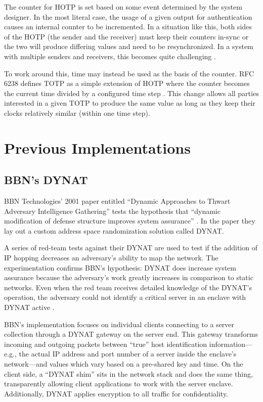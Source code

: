 \par The counter for \ac{HOTP} is set based on some event determined by the system designer. In the most literal case, the usage of a given output for authentication causes an internal counter to be incremented. In a situation like this, both sides of the HOTP (the sender and the receiver) must keep their counters in-sync or the two will produce differing values and need to be resynchronized. In a system with multiple senders and receivers, this becomes quite challenging .

\par To work around this, time may instead be used as the basis of the counter. RFC 6238 defines \ac{TOTP} as a simple extension of \ac{HOTP} where the counter becomes the current time divided by a configured time step \cite{rfc6238}. This change allows all parties interested in a given \ac{TOTP} to produce the same value as long as they keep their clocks relatively similar (within one time step). 

\section{Previous Implementations}
\label{sec:related_research}
\subsection{BBN's \acf{DYNAT}}
\par BBN Technologies' 2001 paper entitled ``Dynamic Approaches to Thwart Adversary Intelligence Gathering'' tests the hypothesis that ``dynamic modification of defense structure improves system assurance'' \cite{BBNDYNAT}. In the paper they lay out a custom address space randomization solution called \acf{DYNAT}.

\par A series of red-team tests against their \ac{DYNAT} are used to test if the addition of \ac{IP} hopping decreases an adversary's ability to map the network. The experimentation confirms BBN's hypothesis: DYNAT does increase system assurance because the adversary's work greatly increases in comparison to static networks. Even when the red team receives detailed knowledge of the DYNAT's operation, the adversary could not identify a critical server in an enclave with DYNAT active \cite{BBNDYNAT}.

\par BBN's implementation focuses on individual clients connecting to a server collection through a DYNAT gateway on the server end. This gateway transforms incoming and outgoing packets between ``true'' host identification information---e.g., the actual \ac{IP} address and port number of a server inside the enclave's network---and values which vary based on a pre-shared key and time. On the client side, a ``DYNAT shim'' sits in the network stack and does the same thing, transparently allowing client applications to work with the server enclave. Additionally, DYNAT applies encryption to all traffic for confidentiality.

